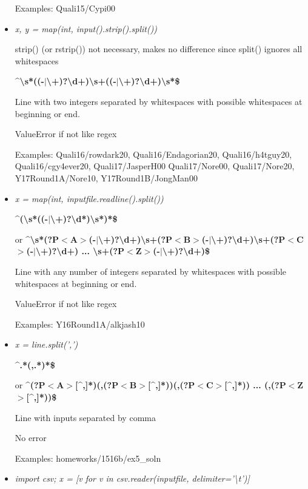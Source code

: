 \documentclass[11pt]{article}
\begin{document}
\begin{itemize}
Examples: Quali15/Cypi00

\item \textit{x, y = map(int, input().strip().split())}

strip() (or rstrip()) not necessary, makes no difference since split() ignores all whitespaces

\textbf{\textasciicircum\textbackslash{}s*((-$|$\textbackslash{}+)?\textbackslash{}d+)\textbackslash{}s+((-$|$\textbackslash{}+)?\textbackslash{}d+)\textbackslash{}s*\$} 

Line with two integers separated by whitespaces with possible whitespaces at beginning or end.

ValueError if not like regex

Examples: Quali16/rowdark20, Quali16/Endagorian20, Quali16/h4tguy20, Quali16/cgy4ever20, Quali17/JasperH00 Quali17/Nore00, Quali17/Nore20, Y17Round1A/Nore10, Y17Round1B/JongMan00

\item \textit{x = map(int, inputfile.readline().split())}

\textbf{\textasciicircum(\textbackslash{}s*((-$|$\textbackslash{}+)?\textbackslash{}d*)\textbackslash{}s*)*\$}

or \textbf{\textasciicircum\textbackslash{}s*(?P$<$A$>$(-$|$\textbackslash{}+)?\textbackslash{}d+)\textbackslash{}s+(?P$<$B$>$(-$|$\textbackslash{}+)?\textbackslash{}d+)\textbackslash{}s+(?P$<$C$>$(-$|$\textbackslash{}+)?\textbackslash{}d+) ... \textbackslash{}s+(?P$<$Z$>$(-$|$\textbackslash{}+)?\textbackslash{}d+)\$}

Line with any number of integers separated by whitespaces with possible whitespaces at beginning or end.

ValueError if not like regex

Examples: Y16Round1A/alkjash10

\item \textit{x = line.split(',')}

\textbf{\textasciicircum.*(,.*)*\$} 

or \textbf{\textasciicircum(?P$<$A$>$[\textasciicircum,]*)(,(?P$<$B$>$[\textasciicircum,]*))(,(?P$<$C$>$[\textasciicircum,]*)) ... (,(?P$<$Z$>$[\textasciicircum,]*))\$}

Line with inputs separated by comma

No error

Examples: homeworks/1516b/ex5\_soln

\item \textit{import csv; x = [v for v in csv.reader(inputfile, delimiter='\textbackslash{}t')]}


\end{itemize}
\end{document}
